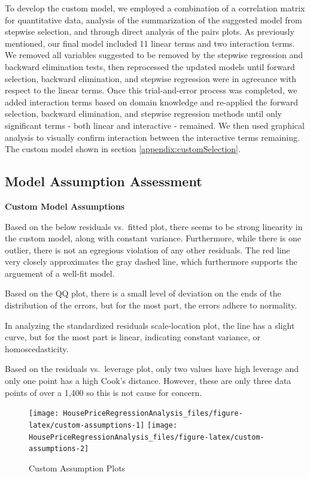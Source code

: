 \documentclass[american,]{article}
\begin{document}
To develop the custom model, we employed a combination of a correlation
matrix for quantitative data, analysis of the summarization of the
suggested model from stepwise selection, and through direct analysis of
the pairs plots. As previously mentioned, our final model included 11
linear terms and two interaction terms. We removed all variables
suggested to be removed by the stepwise regression and backward
elimination tests, then reprocessed the updated models until forward
selection, backward elimination, and stepwise regression were in
agreeance with respect to the linear terms. Once this trial-and-error
process was completed, we added interaction terms based on domain
knowledge and re-applied the forward selection, backward elimination,
and stepwise regression methods until only significant terms - both
linear and interactive - remained. We then used graphical analysis to
visually confirm interaction between the interactive terms remaining.
The custom model shown in section \ref{appendix:customSelection}.

\hypertarget{model-assumption-assessment}{%
\subsection{Model Assumption
Assessment}\label{model-assumption-assessment}}

\textbf{Custom Model Assumptions}

Based on the below residuals vs.~fitted plot, there seems to be strong
linearity in the custom model, along with constant variance.
Furthermore, while there is one outlier, there is not an egregious
violation of any other residuals. The red line very closely approximates
the gray dashed line, which furthermore supports the arguement of a
well-fit model.

Based on the QQ plot, there is a small level of deviation on the ends of
the distribution of the errors, but for the most part, the errors adhere
to normality.

In analyzing the standardized residuals scale-location plot, the line
has a slight curve, but for the most part is linear, indicating constant
variance, or homoscedasticity.

Based on the residuals vs.~leverage plot, only two values have high
leverage and only one point has a high Cook's distance. However, these
are only three data points of over a 1,400 so this is not cause for
concern.

\begin{figure}[htbp]

{\centering \texttt{[image: HousePriceRegressionAnalysis\_files/figure-latex/custom-assumptions-1]} \texttt{[image: HousePriceRegressionAnalysis\_files/figure-latex/custom-assumptions-2]} 

}

\caption{Custom Assumption Plots}\label{fig:custom-assumptions}
\end{figure}
\end{document}
